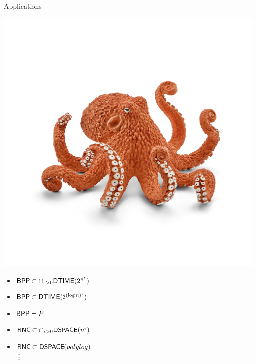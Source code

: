 \documentclass[xcolor={table,dvipsnames,usenames}]{beamer}
\begin{document}
\begin{frame}{Applications}
	\begin{minipage}[b]{0.3\textwidth}
	        \begin{center}
		        \includegraphics[width=\columnwidth]{figures/octopus.jpg}
	        \end{center}
	 \end{minipage}
 \begin{minipage}[b]{0.65\textwidth}
 	        \begin{itemize}
 	        	\pause
				\item $\mathsf{BPP} \subset	\cap_{\epsilon > 0}	\mathsf{DTIME} (2^{n^{\epsilon}})$
				\item   $\mathsf{BPP} \subset \mathsf{DTIME} (2^{(\log n)^{c}})$
				\item $\mathsf{BPP} = P$
				\item $\mathsf{RNC} \subset\cap_{\epsilon > 0}	\mathsf{DSPACE} ({n^{\epsilon}})$
				\item $\mathsf{RNC} \subset \mathsf{DSPACE}(polylog)$\\
				\quad \quad \vdots
 	        \end{itemize}
 	    \end{minipage} 
\end{frame}
\end{document}
